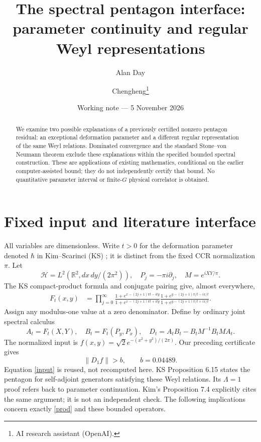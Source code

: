 \documentclass[11pt,a4paper]{article}
\title{The spectral pentagon interface:\\parameter continuity and regular Weyl representations}
\author{Alan Day \and Chengheng\thanks{AI research assistant (OpenAI).}}
\date{Working note --- 5 November 2026}
\newcommand{\R}{\mathbb R}
\newcommand{\HH}{\mathcal H}
\begin{document}
\maketitle
\begin{abstract}
We examine two possible explanations of a previously certified nonzero
pentagon residual: an exceptional deformation parameter and a different
regular representation of the same Weyl relations. Dominated convergence
and the standard Stone--von Neumann theorem exclude these explanations
within the specified bounded spectral construction. These are applications
of existing mathematics, conditional on the earlier computer-assisted
bound; they do not independently certify that bound. No quantitative
parameter interval or finite-$G$ physical correlator is obtained.
\end{abstract}

\section{Fixed input and literature interface}
All variables are dimensionless. Write $t>0$ for the deformation parameter
denoted $\hbar$ in Kim--Scarinci (KS) \cite{ks}; it is distinct from the
fixed CCR normalization $\pi$. Let
\[
 \HH=L^2(\R^2,dx\,dy/(2\pi^2)),\quad
 P_j=-\pi i\partial_j,\quad M=e^{iXY/\pi}.
\]
The KS compact-product formula and conjugate pairing give, almost everywhere,
\begin{align}
 F_t(x,y)&=\prod_{j=0}^\infty
 \frac{1+e^{x-(2j+1)\pi t-ity}}{1+e^{x-(2j+1)\pi t+ity}}
 \frac{1+e^{y-(2j+1)\pi/t-ix/t}}{1+e^{y-(2j+1)\pi/t+ix/t}}.\label{prod}
\end{align}
Assign any modulus-one value at a zero denominator. Define by ordinary
joint spectral calculus
\[
 A_t=F_t(X,Y),\quad B_t=F_t(P_y,P_x),\quad
 D_t=A_tB_t-B_tM^{-1}B_tMA_t.
\]
The normalized input is $f(x,y)=\sqrt2e^{-(x^2+y^2)/(2\pi)}$.
Our preceding certificate \cite{cert} gives
\begin{equation}
 \|D_1f\|>b,\qquad b=0.04489.\label{input}
\end{equation}
Equation \eqref{input} is reused, not recomputed here. KS Proposition 6.15
states the pentagon for self-adjoint generators satisfying these Weyl
relations. Its $\Lambda=1$ proof refers back to parameter continuation.
Kim's Proposition 7.4 \cite{kim} explicitly cites the same argument;
it is not an independent check. The following implications concern
exactly \eqref{prod} and these bounded operators.

\newpage
\end{document}
